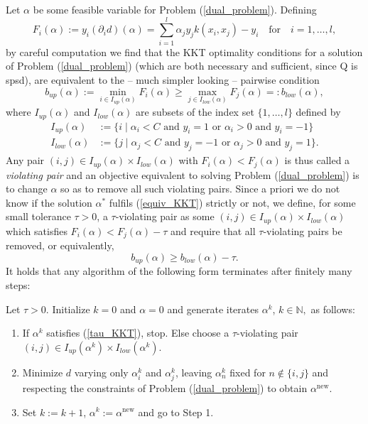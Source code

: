 Let $\alpha$ be some feasible variable for Problem (\ref{dual_problem}). Defining
\begin{equation}
F_i(\alpha) := y_i (\partial_i d)(\alpha) = \sum_{i = 1}^l \alpha_j y_j k(x_i,x_j) - y_i \quad \text{for} \quad i = 1,\ldots,l,
\end{equation}
by careful computation we find that the KKT optimality conditions for a solution of Problem (\ref{dual_problem}) (which are both necessary and sufficient, since Q is spsd), are equivalent to the -- much simpler looking -- pairwise condition
\begin{equation}\label{equiv_KKT}
b_{up}(\alpha) := \min_{i \in I_{up}(\alpha)} F_i(\alpha) \geq \max_{j \in I_{low}(\alpha)} F_j(\alpha) =: b_{low}(\alpha),
\end{equation}
where $I_{up}(\alpha)$ and $I_{low}(\alpha)$ are subsets of the index set $\{1,\ldots,l\}$ defined by
\begin{align}
I_{up}(\alpha) &:= \{ i  \mid  \alpha_i < C \text{ and } y_i = 1 \text{ or } \alpha_i > 0 \text{ and } y_i = -1 \} \\
I_{low}(\alpha) &:= \{ j \mid \alpha_j < C \text{ and } y_j = -1 \text{ or } \alpha_j > 0 \text{ and } y_j = 1 \}.
\end{align} 
Any pair $(i,j) \in I_{up}(\alpha) \times I_{low}(\alpha)$ with $F_i(\alpha) < F_j(\alpha)$ is thus called a \textit{violating pair} and an objective equivalent to solving Problem (\ref{dual_problem}) is to change $\alpha$ so as to remove all such violating pairs. Since a priori we do not know if the solution $\alpha^*$ fulfils (\ref{equiv_KKT}) strictly or not, we define, for some small tolerance $\tau > 0$, a $\tau$-violating pair as some $(i,j) \in I_{up}(\alpha) \times I_{low}(\alpha)$ which satisfies $F_i(\alpha) < F_j(\alpha) - \tau$ and require that all $\tau$-violating pairs be removed, or equivalently, 
\begin{equation}\label{tau_KKT}
b_{up}(\alpha) \geq b_{low}(\alpha) - \tau.
\end{equation}
It holds that any algorithm of the following form terminates after finitely many steps:
\begin{algorithm}\label{GSMO} Let $\tau > 0$. Initialize $k = 0 $ and $\alpha = 0$ and generate iterates $\alpha^k$, $k \in \mathbb{N},$ as follows: 
\begin{enumerate}
\item If $\alpha^k$ satisfies (\ref{tau_KKT}), stop. Else choose a $\tau$-violating pair $(i,j) \in I_{up}(\alpha^k) \times I_{low}(\alpha^k)$.
\item Minimize $d$ varying only $\alpha^k_i$ and $\alpha^k_j$, leaving $\alpha^k_n$ fixed for $n \notin \{i,j\}$ and respecting the constraints of Problem (\ref{dual_problem}) to obtain $\alpha^{\text{new}}$.
\item Set $k := k+1$, $\alpha^k := \alpha^{\text{new}}$ and go to Step 1.
\end{enumerate}
\end{algorithm} 
